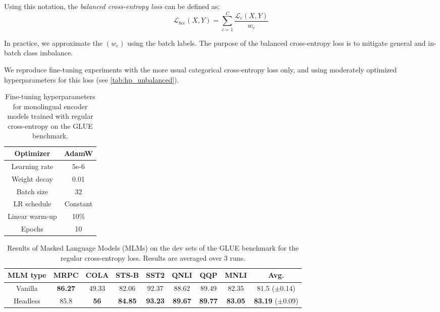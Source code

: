 Using this notation, the \textit{balanced cross-entropy loss} can be defined as:
$$
\mathcal{L}_{bce}(X, Y) = \sum_{c=1}^{C} \frac{\mathcal{L}_c(X, Y)}{w_c}
$$

In practice, we approximate the $(w_c)$ using the batch labels. The purpose of the balanced cross-entropy loss is to mitigate general and in-batch class imbalance.

We reproduce fine-tuning experiments with the more usual categorical cross-entropy loss only, and using moderately optimized hyperparameters for this loss (see \autoref{tab:hp_unbalanced}).

\begin{table}[h]
\centering \small
\begin{tabular}{c|c}
\toprule
Optimizer        &   AdamW         \\ \hline
Learning rate        &   5e-6         \\ \hline
Weight decay  &     0.01      \\ \hline
Batch size & 32 \\ \hline
LR schedule & Constant \\ \hline
Linear warm-up & 10\% \\ \hline
Epochs & 10 \\ \bottomrule
\end{tabular}
\caption{Fine-tuning hyperparameters for monolingual encoder models trained with regular cross-entropy on the GLUE benchmark.}
\label{tab:hp_unbalanced}
\end{table}

\begin{table}[ht]
\centering \small
\begin{tabular}{c|cccccccc}
\toprule
MLM type        & MRPC                        & COLA                        & STS-B                      & SST2                        & QNLI                        & QQP                         & MNLI                        & \textbf{Avg.} \\ \midrule
Vanilla & \textbf{86.27}          & 49.33          & 82.06        & 92.37        & 88.62      & 89.49         & 82.35       & 81.5 \tiny{($\pm$0.14)}         \\ 
Headless & 85.8                       & \textbf{56}                    & \textbf{84.85}                    & \textbf{93.23}                       & \textbf{89.67}                       & \textbf{89.77}                       & \textbf{83.05}                       & \textbf{83.19} \tiny{($\pm$0.09)}            \\ \bottomrule
\end{tabular}
\caption{Results of Masked Language Models (MLMs) on the dev sets of the GLUE benchmark for the regular cross-entropy loss. Results are averaged over 3 runs.}
\label{tab:glue_res_ce}
\end{table}

